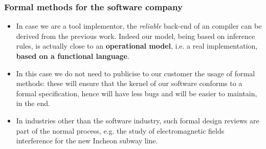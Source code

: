 \documentclass[compress,dvips,xcolor={dvipsnames},t]{beamer}
\begin{document}
%
%
\begin{frame}
\frametitle{Formal methods for the software company}

\begin{itemize}

  \item In case we are a tool implementor, the \emph{reliable}
  back-end of an \ASN compiler can be derived from the previous
  work. Indeed our model, being based on inference rules, is actually
  close to an \textbf{operational model}, i.e. a real implementation,
  \textbf{based on a functional language}.

  \item In this case we do not need to publicise to our customer the
  usage of formal methods: these will ensure that the kernel of our
  software conforms to a formal specification, hence will have less
  bugs and will be easier to maintain, in the end.

  \item In industries other than the software industry, such formal
  design reviews are part of the normal process, e.g. the study of
  electromagnetic fields interference for the new Incheon subway line.

\end{itemize}

\end{frame}











\end{document}
